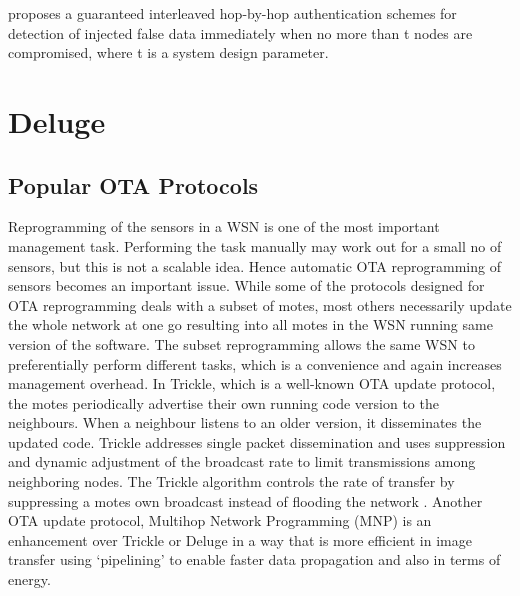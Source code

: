 \documentclass[conference,man]{IEEEtran}
\begin{document}
\cite{Zhu:2007:IHA:1267060.1267062} proposes a guaranteed interleaved hop-by-hop authentication schemes for detection of injected false data immediately when no more than t nodes are compromised, where t is a system design parameter. 




\section{Deluge} %
\label{sec:del}


\subsection{Popular OTA Protocols}
Reprogramming of the sensors in a WSN is one of the most important management task.
Performing the task manually may work out for a small no of sensors, but this is not a scalable idea.
Hence automatic OTA reprogramming of sensors becomes an important issue.
While some of the protocols designed for OTA reprogramming deals with a subset of motes, most others necessarily update the whole network at one go resulting into all motes in the WSN running same version of the software.
The subset reprogramming allows the same WSN to preferentially perform different tasks, which is a convenience and again increases management overhead.
In Trickle, which is a well-known OTA update protocol, the motes periodically advertise their own running code version to the neighbours. 
When a neighbour listens to an older version, it disseminates the updated code. 
Trickle addresses single packet dissemination and uses suppression and dynamic adjustment of the broadcast rate to limit transmissions among neighboring nodes.
The Trickle algorithm controls the rate of transfer by suppressing a motes own broadcast  instead of flooding the network \cite{ISI:000221664800002}.%
Another OTA update protocol, Multihop Network Programming (MNP) is an enhancement over Trickle or Deluge in a way that is more efficient in image transfer using `pipelining' to enable faster data propagation and also in terms of energy.
\end{document}
